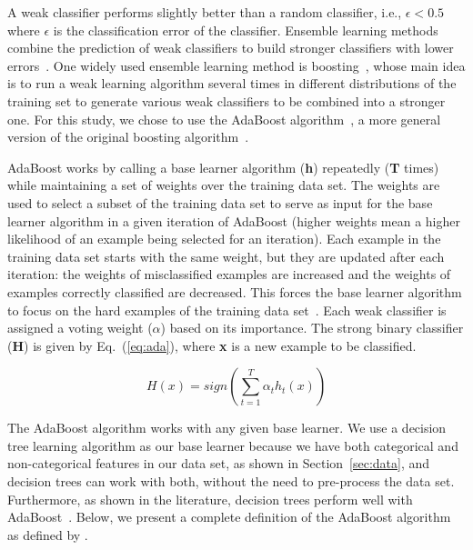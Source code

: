 A weak classifier performs slightly better than a random classifier, i.e.,
$\epsilon < 0.5$ where $\epsilon$ is the classification error of the
classifier. Ensemble learning methods combine the prediction of weak
classifiers to build stronger classifiers with lower errors~\citep{aima}. One
widely used ensemble learning method is boosting~\citep{aima}, whose main idea
is to run a weak learning algorithm several times in different distributions of
the training set to generate various weak classifiers to be combined into a
stronger one. For this study, we chose to use the AdaBoost
algorithm~\citep{freund1999short}, a more general version of the original
boosting algorithm~\citep{polikar2006ensemble}.

AdaBoost works by calling a base learner algorithm (\textbf{h}) repeatedly
(\textbf{T} times) while maintaining a set of weights over the training data
set. The weights are used to select a subset of the training data set to serve
as input for the base learner algorithm in a given iteration of AdaBoost
(higher weights mean a higher likelihood of an example being selected for an
iteration). Each example in the training data set starts with the same weight,
but they are updated after each iteration: the weights of misclassified
examples are increased and the weights of examples correctly classified are
decreased. This forces the base learner algorithm to focus on the hard examples
of the training data set~\citep{freund1999short}. Each weak classifier is
assigned a voting weight (\boldmath$\alpha$) based on its importance. The
strong binary classifier (\textbf{H}) is given by Eq.~(\ref{eq:ada}), where
\textbf{x} is a new example to be classified.

\begin{equation}\label{eq:ada}
  H\left(x\right) = \mathit{sign} \left( \sum\limits_{t=1}^T\alpha_t h_t(x) \right)
\end{equation}

The AdaBoost algorithm works with any given base learner. We use a decision
tree learning algorithm as our base learner because we have both categorical
and non-categorical features in our data set, as shown in
Section~\ref{sec:data}, and decision trees can work with both, without the need
to pre-process the data set. Furthermore, as shown in the literature, decision
trees perform well with AdaBoost~\citep{drucker1996boosting}. Below, we present a
complete definition of the AdaBoost algorithm as defined by
\cite{freund1999short}.

